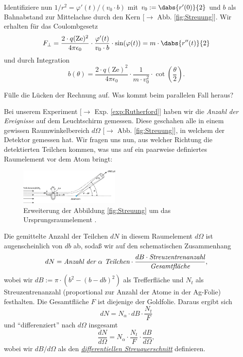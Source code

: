 \documentclass{subfiles}
\begin{document}
        Identifiziere nun $1/r^2=\varphi'(t)/(v_0\cdot b)$ mit $v_0:=\dabs{r'(0)}{2}$ und $b$ als Bahnabstand zur Mittelachse durch den Kern [$\to$ Abb. \ref{fig:Streuung}]. Wir erhalten für das Coulombgesetz 
        \[F_\perp=\frac{2\cdot q(\text{Ze})^2}{4\pi\epsilon_0}\cdot\frac{\varphi'(t)}{v_0\cdot b}\cdot\sin(\varphi(t))=m\cdot\dabs{r''(t)}{2}\]
        und durch Integration 
        \[b(\theta)=\frac{2\cdot q(\text{Ze})^2}{4\pi\epsilon_0}\cdot\frac{1}{m\cdot v_0^2}\cdot\cot(\frac{\theta}{2}).\]
        \begin{Aufgabe}
            \nr{} Fülle die Lücken der Rechnung auf. Was kommt beim parallelen Fall heraus?
        \end{Aufgabe}
        Bei unserem Experiment [$\to$ Exp. \ref{exp:Rutherford}] haben wir die \emph{Anzahl der Ereignisse} auf dem Leuchtschirm gemessen. Diese geschahen alle in einem gewissen Raumwinkelbereich $d\Omega$ [$\to$ Abb. \ref{fig:Streuung}], in welchem der Detektor gemessen hat. Wir fragen uns nun, aus welcher Richtung die detektierten Teilchen kommen, was uns auf ein paarweise definiertes Raumelement vor dem Atom bringt: 
        \begin{figure}
            \centering
            \includegraphics[width=5cm]{Bilddateien/physiko.21.45_9783110445671-fig_002.jpg}
            \caption[short]{Erweiterung der Abbildung \ref{fig:Streuung} um das Ursprungsraumelement \cite{degruyer:Streuung}.}
            \label{fig:StreuungRaumelemente}
        \end{figure}
        Die gemittelte Anzahl der Teilchen $dN$ in diesem Raumelement $d\Omega$ ist augenscheinlich von $db$ ab, sodaß wir auf den schematischen Zusammenhang 
        \[dN = \emph{Anzahl der }\alpha\emph{ Teilchen}\cdot\frac{dB\cdot \emph{Streuzentrenanzahl}}{\emph{Gesamtfläche}},\]
        wobei wir $dB:=\pi\cdot(b^2-(b-db)^2)$ als Trefferfläche und $N_t$ als Streuzentrenanzahl (proportional zur Anzahl der Atome in der Ag-Folie) festhalten. Die Gesamtfläche $F$ ist diejenige der Goldfolie. Daraus ergibt sich
        \[dN = N_\alpha \cdot dB \cdot\frac{N_t}{F}\]
        und \enquote{differenziert} nach $d\Omega$ insgesamt
        \[\frac{dN}{d\Omega} = N_\alpha \cdot\frac{N_t}{F}\cdot\frac{dB}{d\Omega},\]
        wobei wir $dB/d\Omega$ als den \href{https://de.wikipedia.org/wiki/Wirkungsquerschnitt}{\emph{differentiellen Streuquerschnitt}} definieren. 
\end{document}
